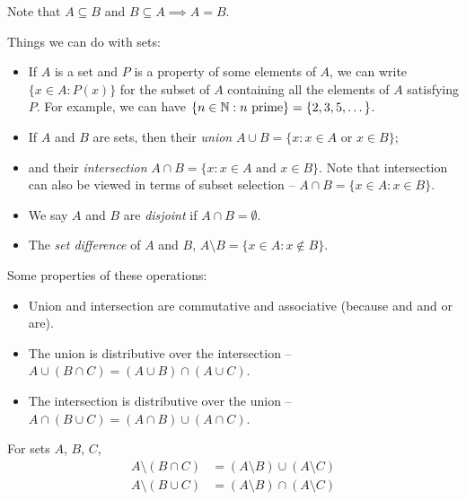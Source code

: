 \documentclass{../template/note}
\begin{document}
    Note that \(A \subseteq B\) and \(B \subseteq A \implies A = B\).

    Things we can do with sets:

    \begin{itemize}
        \item If \(A\) is a set and \(P\) is a property of some elements of \(A\), we can write \(\{x \in A: P(x)\}\) for the subset of \(A\) containing all the elements of \(A\) satisfying \(P\). For example, we can have \(\{n \in \mathbb N: n \text{ prime}\} = \{2, 3, 5, \dots\}\).
        \item If \(A\) and \(B\) are sets, then their \emph{union} \(A \cup B = \{x : x \in A \text{ or } x \in B\}\);
        \item and their \emph{intersection} \(A \cap B = \{x : x \in A \text{ and } x \in B\}\). Note that intersection can also be viewed in terms of subset selection -- \(A \cap B = \{x \in A : x \in B\}\).
        \item We say \(A\) and \(B\) are \emph{disjoint} if \(A \cap B = \emptyset\).
        \item The \emph{set difference} of \(A\) and \(B\), \(A \setminus B = \{x \in A: x \notin B\}\).
    \end{itemize}

    Some properties of these operations:

    \begin{itemize}
        \item Union and intersection are commutative and associative (because and and or are).
        \item The union is distributive over the intersection -- \(A \cup (B \cap C) = (A \cup B) \cap (A \cup C)\).
        \item The intersection is distributive over the union -- \(A \cap (B \cup C) = (A \cap B) \cup (A \cap C)\).
    \end{itemize}


    \begin{proposition}
        For sets \(A\), \(B\), \(C\),
        \begin{align*}
            A \setminus (B \cap C) &= (A \setminus B) \cup (A \setminus C) \\
            A \setminus (B \cup C) &= (A \setminus B) \cap (A \setminus C)
        \end{align*}
    \end{proposition}
    
\end{document}
